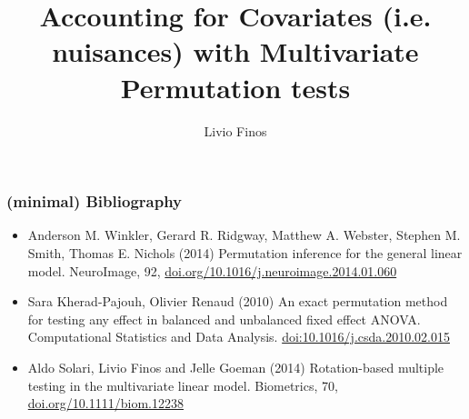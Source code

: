 \documentclass[xcolor={pdftex,dvipsnames,table}]{beamer}
\title{Accounting for Covariates (i.e. nuisances) with Multivariate Permutation tests}
\author{Livio Finos}
\institute{University of Padova}
\begin{document}
{
\begin{frame}
\titlepage
\end{frame}
}

\begin{frame}
\frametitle{(minimal) Bibliography}

\begin{itemize}
\item Anderson M. Winkler, Gerard R. Ridgway, Matthew A. Webster, Stephen M. Smith, Thomas E. Nichols (2014)
Permutation inference for the general linear model.
NeuroImage, 92, \url{doi.org/10.1016/j.neuroimage.2014.01.060}
\item Sara Kherad-Pajouh, Olivier Renaud (2010) An exact permutation method for testing any effect in balanced and unbalanced fixed effect ANOVA. Computational Statistics and Data Analysis. \url{doi:10.1016/j.csda.2010.02.015}
\item Aldo Solari, Livio Finos and Jelle Goeman (2014) Rotation-based multiple testing in the multivariate linear model.
Biometrics, 70, \url{doi.org/10.1111/biom.12238}
\end{itemize}

\end{frame}

\end{document}
